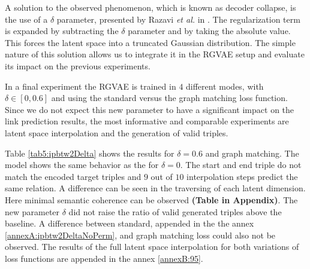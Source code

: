 A solution to the observed phenomenon, which is known as decoder collapse, is the use of a $\delta$ parameter, presented by Razavi \textit{et al.} in \cite{razavi_preventing_2018}. The regularization term is expanded by subtracting the $\delta$ parameter and by taking the absolute value. This forces the latent space into a truncated Gaussian distribution. The simple nature of this solution allows us to integrate it in the RGVAE setup and evaluate its impact on the previous experiments.

In a final experiment the RGVAE is trained in $4$ different modes, with $\delta \in [0, 0.6]$ and using the standard versus the graph matching loss function. Since we do not expect this new parameter to have a significant impact on the link prediction results, the most informative and comparable experiments are latent space interpolation and the generation of valid triples.

Table \ref{tab5:ipbtw2Delta} shows the results for $\delta = 0.6$ and graph matching. The model shows the same behavior as the for $\delta = 0$. The start and end triple do not match the encoded target triples and $9$ out of $10$ interpolation steps predict the same relation. A difference can be seen in the traversing of each latent dimension. Here minimal semantic coherence can be observed \textbf{(Table in Appendix)}.
The new parameter $\delta$ did not raise the ratio of valid generated triples above the baseline.
A difference between standard, appended in the the annex \ref{annexA:ipbtw2DeltaNoPerm}, and graph matching loss could also not be observed. The results of the full latent space interpolation for both variations of loss functions are appended in the annex \ref{annexB:95}.

